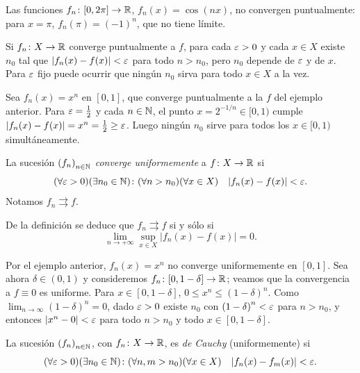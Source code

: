 \begin{eg}
  Las funciones \(f_n\colon [0, 2\pi] \to \mathbb{R}\), \(f_n(x) = \cos(nx)\), no convergen puntualmente: para \(x = \pi\), \(f_n(\pi) = {(-1)}^n\), que no tiene límite.
\end{eg}

Si \(f_n\colon X \to \mathbb{R}\) converge puntualmente a \(f\), para cada \(\varepsilon > 0\) y cada \(x \in X\) existe \(n_0\) tal que \(|f_n(x) - f(x)| < \varepsilon\) para todo \(n > n_0\), pero \(n_0\) depende de \(\varepsilon\) y de \(x\). Para \(\varepsilon\) fijo puede ocurrir que ningún \(n_0\) sirva para todo \(x \in X\) a la vez.

\begin{eg}
  Sea \(f_n(x) = x^n\) en \([0, 1]\), que converge puntualmente a la \(f\) del ejemplo anterior. Para \(\varepsilon = \frac{1}{2}\) y cada \(n \in \mathbb{N}\), el punto \(x = 2^{-1/n} \in [0, 1)\) cumple \(|f_n(x) - f(x)| = x^n = \frac{1}{2} \geq \varepsilon\). Luego ningún \(n_0\) sirve para todos los \(x \in [0, 1)\) simultáneamente.
\end{eg}

\begin{definition}
  La sucesión \({(f_n)}_{n \in \mathbb{N}}\) \emph{converge uniformemente} a \(f\colon X \to \mathbb{R}\) si
  \[
    (\forall \varepsilon > 0)(\exists n_0 \in \mathbb{N}) \colon (\forall n > n_0)(\forall x \in X) \quad |f_n(x) - f(x)| < \varepsilon.
  \]
  Notamos \(f_n \rightrightarrows f\).
\end{definition}

De la definición se deduce que \(f_n \rightrightarrows f\) si y sólo si
\[
  \lim_{n \to +\infty} \sup_{x \in X} |f_n(x) - f(x)| = 0.
\]

\begin{eg}
  Por el ejemplo anterior, \(f_n(x) = x^n\) no converge uniformemente en \([0, 1]\). Sea ahora \(\delta \in (0, 1)\) y consideremos \(f_n\colon [0, 1 - \delta] \to \mathbb{R}\); veamos que la convergencia a \(f \equiv 0\) es uniforme. Para \(x \in [0, 1 - \delta]\), \(0 \leq x^n \leq {(1 - \delta)}^n\). Como \(\lim_{n \to \infty} {(1 - \delta)}^n = 0\), dado \(\varepsilon > 0\) existe \(n_0\) con \({(1 - \delta)}^n < \varepsilon\) para \(n > n_0\), y entonces \(|x^n - 0| < \varepsilon\) para todo \(n > n_0\) y todo \(x \in [0, 1 - \delta]\).
\end{eg}

\begin{definition}
  La sucesión \({(f_n)}_{n \in \mathbb{N}}\), con \(f_n\colon X \to \mathbb{R}\), es \emph{de Cauchy} (uniformemente) si
  \[
    (\forall \varepsilon > 0)(\exists n_0 \in \mathbb{N}) \colon (\forall n, m > n_0)(\forall x \in X) \quad |f_n(x) - f_m(x)| < \varepsilon.
  \]
\end{definition}

